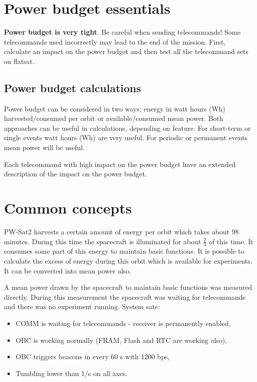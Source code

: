 \section{Power budget essentials}

\textbf{Power budget is very tight}. Be careful when sending telecommands! Some telecommands used incorrectly may lead to the end of the mission. First, calculate an impact on the power budget and then test all the telecommand sets on flatsat.

\subsection{Power budget calculations}
Power budget can be considered in two ways: energy in watt hours (Wh) harvested/consumed per orbit or available/consumed mean power. Both approaches can be useful in calculations, depending on feature. For short-term or single events watt hours (Wh) are very useful. For periodic or permanent events mean power will be useful.

Each telecommand with high impact on the power budget have an extended description of the impact on the power budget.

\section{Common concepts}
PW-Sat2 harvests a certain amount of energy per orbit which takes about 98 minutes. During this time the spacecraft is illuminated for about $\frac{2}{3}$ of this time. It consumes some part of this energy to maintain basic functions. It is possible to calculate the excess of energy during this orbit which is available for experiments. It can be converted into mean power also.

A mean power drawn by the spacecraft to maintain basic functions was measured directly. During this measurement the spacecraft was waiting for telecommands and there was no experiment running. System sate:
\begin{itemize}
	\item COMM is waiting for telecommands - receiver is permanently enabled,
	\item OBC is working normally (FRAM, Flash and RTC are working also),
	\item OBC triggers beacons in every 60 s with 1200 bps,
	\item Tumbling lower than 1\textdegree/s on all axes.
\end{itemize}

